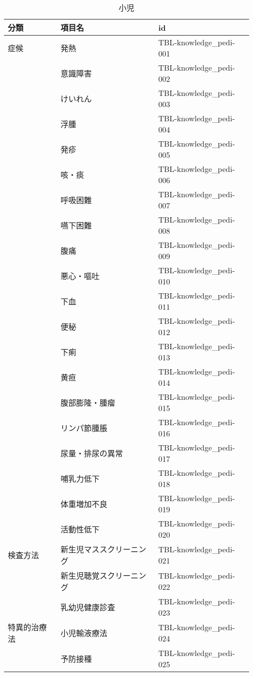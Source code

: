 \begin{xltabular}{\linewidth}{XXX}
\caption{\label{tbl:knowledge_pedi}小児} \\
\toprule
分類 & 項目名 & id \\
\midrule
\endhead
症候 & 発熱 & TBL-knowledge_pedi-001 \\
 & 意識障害 & TBL-knowledge_pedi-002 \\
 & けいれん & TBL-knowledge_pedi-003 \\
 & 浮腫 & TBL-knowledge_pedi-004 \\
 & 発疹 & TBL-knowledge_pedi-005 \\
 & 咳・痰 & TBL-knowledge_pedi-006 \\
 & 呼吸困難 & TBL-knowledge_pedi-007 \\
 & 嚥下困難 & TBL-knowledge_pedi-008 \\
 & 腹痛 & TBL-knowledge_pedi-009 \\
 & 悪心・嘔吐 & TBL-knowledge_pedi-010 \\
 & 下血 & TBL-knowledge_pedi-011 \\
 & 便秘 & TBL-knowledge_pedi-012 \\
 & 下痢 & TBL-knowledge_pedi-013 \\
 & 黄疸 & TBL-knowledge_pedi-014 \\
 & 腹部膨隆・腫瘤 & TBL-knowledge_pedi-015 \\
 & リンパ節腫脹 & TBL-knowledge_pedi-016 \\
 & 尿量・排尿の異常 & TBL-knowledge_pedi-017 \\
 & 哺乳力低下 & TBL-knowledge_pedi-018 \\
 & 体重増加不良 & TBL-knowledge_pedi-019 \\
 & 活動性低下 & TBL-knowledge_pedi-020 \\
検査方法 & 新生児マススクリーニング & TBL-knowledge_pedi-021 \\
 & 新生児聴覚スクリーニング & TBL-knowledge_pedi-022 \\
 & 乳幼児健康診査 & TBL-knowledge_pedi-023 \\
特異的治療法 & 小児輸液療法 & TBL-knowledge_pedi-024 \\
 & 予防接種 & TBL-knowledge_pedi-025 \\
\bottomrule
\end{xltabular}

